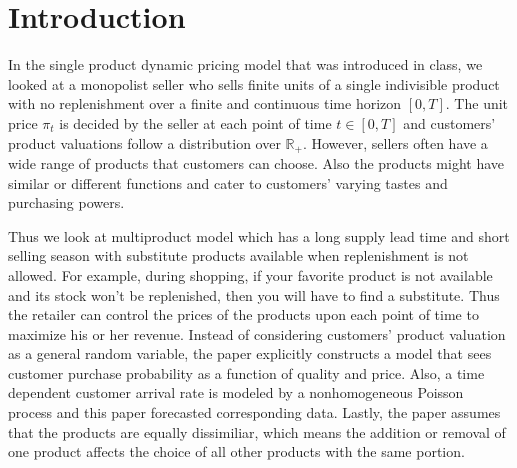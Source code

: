 


\section{Introduction}

In the single product dynamic pricing model that was introduced in class, we looked at a monopolist seller who sells finite units of a single indivisible product with no replenishment over a finite and continuous time horizon $[0,T]$. The unit price $\pi_t$ is decided by the seller at each point of time $t \in [0,T]$ and customers' product valuations follow a distribution over $\mathbb{R}_+$. However, sellers often have a wide range of products that customers can choose. Also the products might have similar or different functions and cater to customers' varying tastes and purchasing powers. 

Thus we look at multiproduct model \cite{Li2009} which has a long supply lead time and short selling season with substitute products available when replenishment is not allowed. For example, during shopping, if your favorite product is not available and its stock won't be replenished, then you will have to find a substitute. Thus the retailer can control the prices of the products upon each point of time to maximize his or her revenue. Instead of considering customers' product valuation as a general random variable, the paper explicitly constructs a model that sees customer purchase probability as a function of quality and price. Also, a time dependent customer arrival rate is modeled by a nonhomogeneous Poisson process and this paper forecasted corresponding data. Lastly, the paper assumes that the products are equally dissimiliar, which means the addition or removal of one product affects the choice of all other products with the same portion.







